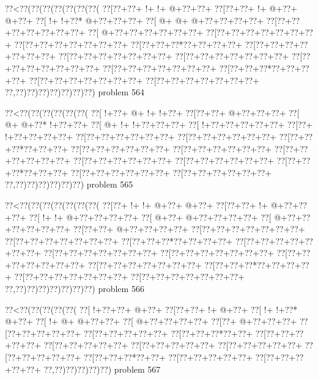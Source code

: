 \vbox{\vbox{\goo
\0??<\0??(\0??(\0??(\0??(\0??(\0??(\0??(
\0??[\0??+\0??+\- !+\- !+\- @+\0??+\0??+
\0??[\0??+\0??+\- !+\- @+\0??+\- @+\0??+
\0??[\- !+\- !+\0??*\- @+\0??+\0??+\0??+
\0??[\- @+\- @+\- @+\0??+\0??+\0??+\0??+
\0??[\0??+\0??+\0??+\0??+\0??+\0??+\0??+
\0??[\- @+\0??+\0??+\0??+\0??+\0??+\0??+
\0??[\0??+\0??+\0??+\0??+\0??+\0??+\0??+
\0??[\0??+\0??+\0??+\0??+\0??+\0??+\0??+
\0??[\0??+\0??+\0??*\0??+\0??+\0??+\0??+
\0??[\0??+\0??+\0??+\0??+\0??+\0??+\0??+
\0??[\0??+\0??+\0??+\0??+\0??+\0??+\0??+
\0??[\0??+\0??+\0??+\0??+\0??+\0??+\0??+
\0??[\0??+\0??+\0??+\0??+\0??+\0??+\0??+
\0??[\0??+\0??+\0??+\0??+\0??+\0??+\0??+
\0??[\0??+\0??+\0??*\0??+\0??+\0??+\0??+
\0??[\0??+\0??+\0??+\0??+\0??+\0??+\0??+
\0??[\0??+\0??+\0??+\0??+\0??+\0??+\0??+
\0??,\0??)\0??)\0??)\0??)\0??)\0??)\0??)
}
\hfil problem 564\hfil\break
}

\vbox{\vbox{\goo
\0??<\0??(\0??(\0??(\0??(\0??(\0??(
\0??[\- !+\0??+\- @+\- !+\- !+\0??+
\0??[\0??+\0??+\- @+\0??+\0??+\0??+
\0??[\- @+\- @+\0??*\- !+\0??+\0??+
\0??[\- @+\- !+\- !+\0??+\0??+\0??+
\0??[\- !+\0??+\0??+\0??+\0??+\0??+
\0??[\0??+\- !+\0??+\0??+\0??+\0??+
\0??[\0??+\0??+\0??+\0??+\0??+\0??+
\0??[\0??+\0??+\0??+\0??+\0??+\0??+
\0??[\0??+\0??+\0??*\0??+\0??+\0??+
\0??[\0??+\0??+\0??+\0??+\0??+\0??+
\0??[\0??+\0??+\0??+\0??+\0??+\0??+
\0??[\0??+\0??+\0??+\0??+\0??+\0??+
\0??[\0??+\0??+\0??+\0??+\0??+\0??+
\0??[\0??+\0??+\0??+\0??+\0??+\0??+
\0??[\0??+\0??+\0??*\0??+\0??+\0??+
\0??[\0??+\0??+\0??+\0??+\0??+\0??+
\0??[\0??+\0??+\0??+\0??+\0??+\0??+
\0??,\0??)\0??)\0??)\0??)\0??)\0??)
}
\hfil problem 565\hfil\break
}

\vbox{\vbox{\goo
\0??<\0??(\0??(\0??(\0??(\0??(\0??(\0??(
\0??[\0??+\- !+\- !+\- @+\0??+\- @+\0??+
\0??[\0??+\0??+\- !+\- @+\0??+\0??+\0??+
\0??[\- !+\- !+\- @+\0??+\0??+\0??+\0??+
\0??[\- @+\0??+\- @+\0??+\0??+\0??+\0??+
\0??[\- @+\0??+\0??+\0??+\0??+\0??+\0??+
\0??[\0??+\0??+\- @+\0??+\0??+\0??+\0??+
\0??[\0??+\0??+\0??+\0??+\0??+\0??+\0??+
\0??[\0??+\0??+\0??+\0??+\0??+\0??+\0??+
\0??[\0??+\0??+\0??*\0??+\0??+\0??+\0??+
\0??[\0??+\0??+\0??+\0??+\0??+\0??+\0??+
\0??[\0??+\0??+\0??+\0??+\0??+\0??+\0??+
\0??[\0??+\0??+\0??+\0??+\0??+\0??+\0??+
\0??[\0??+\0??+\0??+\0??+\0??+\0??+\0??+
\0??[\0??+\0??+\0??+\0??+\0??+\0??+\0??+
\0??[\0??+\0??+\0??*\0??+\0??+\0??+\0??+
\0??[\0??+\0??+\0??+\0??+\0??+\0??+\0??+
\0??[\0??+\0??+\0??+\0??+\0??+\0??+\0??+
\0??,\0??)\0??)\0??)\0??)\0??)\0??)\0??)
}
\hfil problem 566\hfil\break
}

\vbox{\vbox{\goo
\0??<\0??(\0??(\0??(\0??(\0??(
\0??[\- !+\0??+\0??+\- @+\0??+
\0??[\0??+\0??+\- !+\- @+\0??+
\0??[\- !+\- !+\0??*\- @+\0??+
\0??[\- !+\- @+\- @+\0??+\0??+
\0??[\- @+\0??+\0??+\0??+\0??+
\0??[\0??+\- @+\0??+\0??+\0??+
\0??[\0??+\0??+\0??+\0??+\0??+
\0??[\0??+\0??+\0??+\0??+\0??+
\0??[\0??+\0??+\0??*\0??+\0??+
\0??[\0??+\0??+\0??+\0??+\0??+
\0??[\0??+\0??+\0??+\0??+\0??+
\0??[\0??+\0??+\0??+\0??+\0??+
\0??[\0??+\0??+\0??+\0??+\0??+
\0??[\0??+\0??+\0??+\0??+\0??+
\0??[\0??+\0??+\0??*\0??+\0??+
\0??[\0??+\0??+\0??+\0??+\0??+
\0??[\0??+\0??+\0??+\0??+\0??+
\0??,\0??)\0??)\0??)\0??)\0??)
}
\hfil problem 567\hfil\break
}

